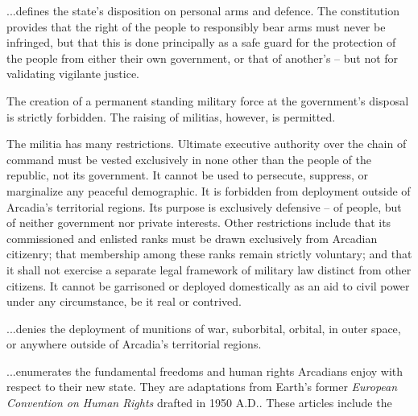 \item %

...defines the state's disposition on personal arms and defence. The constitution provides that the right of the people to responsibly bear arms must never be infringed, but that this is done principally as a safe guard for the protection of the people from either their own government, or that of another's -- but not for validating vigilante justice.

The creation of a permanent standing military force at the government's disposal is strictly forbidden. The raising of militias, however, is permitted.

The militia has many restrictions. Ultimate executive authority over the chain of command must be vested exclusively in none other than the people of the republic, not its government. It cannot be used to persecute, suppress, or marginalize any peaceful demographic. It is forbidden from deployment outside of Arcadia's territorial regions. Its purpose is exclusively defensive -- of people, but of neither government nor private interests. Other restrictions include that its commissioned and enlisted ranks must be drawn exclusively from Arcadian citizenry; that membership among these ranks remain strictly voluntary; and that it shall not exercise a separate legal framework of military law distinct from other citizens. It cannot be garrisoned or deployed domestically as an aid to civil power under any circumstance, be it real or contrived.

\item %

...denies the deployment of munitions of war, suborbital, orbital, in outer space, or anywhere outside of Arcadia's territorial regions.
\stoparticle

\startarticle[start=11]
\item %

...enumerates the fundamental freedoms and human rights Arcadians enjoy with respect to their new state. They are adaptations from Earth's former {\it European Convention on Human Rights} drafted in 1950 A.D.. These articles include the

